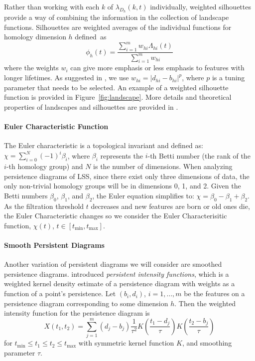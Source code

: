 \documentclass[12pt]{article}
\begin{document}
Rather than working with each $k$ of $\lambda_{D_h}(k, t)$ individually, weighted silhouettes provide a way of combining the information in the collection of landscape functions. Silhouettes are weighted averages of the individual functions for homology dimension $h$ defined~as
%
\begin{equation*}
\phi_h(t) = \frac{\sum_{i = 1}^mw_{hi}\Lambda_{hi}(t)}{\sum_{i = 1}^mw_{hi}}
\end{equation*}
where the weights $w_i$ can give more emphasis or less emphasis to features with longer lifetimes. As suggested in \citep{chazal2014stochastic}, we use $w_{hi} = |d_{hi} - b_{hi}|^p$, where $p$ is a tuning parameter that needs to be selected.  An example of a weighted silhouette function is provided in Figure~\ref{fig:landscape}.
More details and theoretical properties of landscapes and silhouettes are provided in \citep{chazal2014stochastic}.

\paragraph{Euler Characteristic Function}
The Euler characteristic is a topological invariant and defined as: $\chi = \sum_{i=0}^{N} (-1)^{i} \beta_{i}$,
where $\beta_{i}$ represents the $i$-th Betti number (the rank of the $i$-th homology group) and $N$ is the number of dimensions. When analyzing persistence diagrams of LSS, since there exist only three dimensions of data, the only non-trivial homology groups will be in dimensions 0, 1, and 2. Given the Betti numbers $\beta_{0}$, $\beta_{1}$, and $\beta_{2}$, the Euler equation simplifies to:
$\chi = \beta_{0} - \beta_{1} + \beta_{2}.$
As the filtration threshold $t$ decreases and new features are born or old ones die, the Euler Characteristic changes so we consider the Euler Characterisitic function, $\chi(t)$, $t \in [t_{\min}, t_{\max}]$.




\paragraph{Smooth Persistent Diagrams}
Another variation of persistent diagrams we will consider are smoothed persistence diagrams. \cite{chen2015statistical} introduced \emph{persistent intensity functions}, which is a weighted kernel density estimate of a persistence diagram with weights as a function of a point's persistence. Let $(b_i, d_i)$, $i = 1, \ldots, m$ be the features on a persistence diagram corresponding to some dimension $h$. Then the weighted intensity function for the persistence diagram is
%
\[ X(t_1, t_2) = \sum_{j=1}^m(d_{j} - b_{j})\frac{1}{\tau^{2}}K \left(\frac{t_1-d_{j}}{\tau}\right)K \left(\frac{t_2-b_{j}}{\tau}\right)\]
%
for $t_{\min} \leq t_1 \leq t_2 \leq t_{\max}$ with symmetric kernel function $K$, and smoothing parameter $\tau$. 
\end{document}
